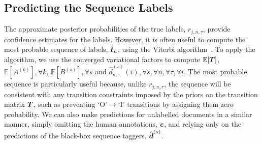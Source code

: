 \subsection{Predicting the Sequence Labels}

The approximate posterior probabilities of the true labels, $r_{j,n,\tau}$, provide confidence estimates for the labels. However, it is often useful to  compute 
the most probable sequence of labels, $\hat{\boldsymbol t}_n$, using the
Viterbi algorithm~\cite{viterbi1967error}. 
To apply the algorithm, we use the converged variational factors to compute 
$\mathbb{E}[\boldsymbol T]$, $\mathbb{E}[A^{(k)}],\forall k$, $\mathbb{E}[B^{(s)}],\forall s$ and
$\hat{d}_{n,\tau}^{(s)}(i), \forall s, \forall n, \forall \tau, \forall i$.
The most probable sequence is particularly useful because, unlike $r_{j,n,\tau}$,
the sequence will be consistent with any transition 
constraints imposed by the priors on the transition matrix $\boldsymbol T$, 
such as preventing `O'$\rightarrow$`I' transitions by assigning them zero probability.
We can also make predictions for unlabelled documents in a similar manner,
simply omitting the human annotations, $\boldsymbol c$, and relying only on the predictions
of the black-box sequence taggers, $\hat{\boldsymbol d}^{(s)}$.

